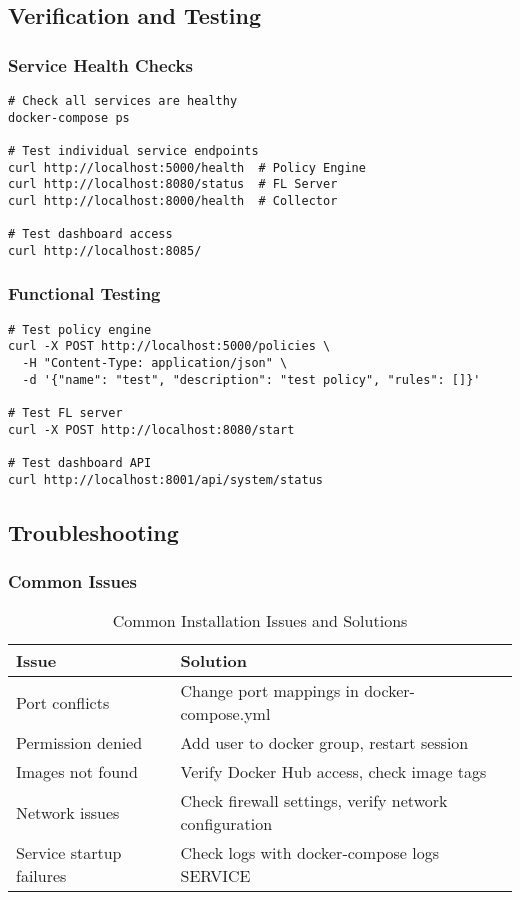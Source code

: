 \subsection{Verification and Testing}

\subsubsection{Service Health Checks}

\begin{lstlisting}[style=bashcode, caption=Health Check Verification]
# Check all services are healthy
docker-compose ps

# Test individual service endpoints
curl http://localhost:5000/health  # Policy Engine
curl http://localhost:8080/status  # FL Server
curl http://localhost:8000/health  # Collector

# Test dashboard access
curl http://localhost:8085/
\end{lstlisting}

\subsubsection{Functional Testing}

\begin{lstlisting}[style=bashcode, caption=Basic Functionality Test]
# Test policy engine
curl -X POST http://localhost:5000/policies \
  -H "Content-Type: application/json" \
  -d '{"name": "test", "description": "test policy", "rules": []}'

# Test FL server
curl -X POST http://localhost:8080/start

# Test dashboard API
curl http://localhost:8001/api/system/status
\end{lstlisting}

\subsection{Troubleshooting}

\subsubsection{Common Issues}

\begin{table}[H]
\centering
\caption{Common Installation Issues and Solutions}
\label{tab:troubleshooting}
\begin{tabularx}{\textwidth}{@{}lX@{}}
\toprule
\textbf{Issue} & \textbf{Solution} \\
\midrule
Port conflicts & Change port mappings in docker-compose.yml \\
Permission denied & Add user to docker group, restart session \\
Images not found & Verify Docker Hub access, check image tags \\
Network issues & Check firewall settings, verify network configuration \\
Service startup failures & Check logs with docker-compose logs SERVICE \\
\bottomrule
\end{tabularx}
\end{table}

